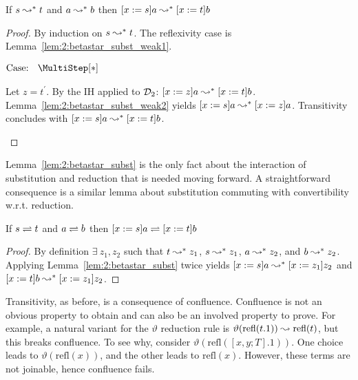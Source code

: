 \begin{lemma}
    If $s \leadsto^* t$ and $a \leadsto^* b$ then $[x := s]a \leadsto^* [x := t]b$
    \label{lem:2:betastar_subst}
\end{lemma}
\begin{proof}
    By induction on $s \leadsto^* t$.
    The reflexivity case is Lemma~\ref{lem:2:betastar_subst_weak1}.

    $\text{Case: }\begin{array}{c} \MultiStep[*] \end{array}$
    \begin{proofcase}
        Let $z = t^\prime$.
        By the IH applied to $\mathcal{D}_{2}$: $[x := z]a \leadsto^* [x := t]b$.
        Lemma~\ref{lem:2:betastar_subst_weak2} yields $[x := s]a \leadsto^* [x := z]a$.
        Transitivity concludes with $[x := s]a \leadsto^* [x := t]b$.
    \end{proofcase}
\end{proof}

Lemma~\ref{lem:2:betastar_subst} is the only fact about the interaction of substitution and reduction that is needed moving forward.
A straightforward consequence is a similar lemma about substitution commuting with convertibility w.r.t. reduction.

\begin{lemma}
    If $s \rightleftharpoons t$ and $a \rightleftharpoons b$ then $[x := s]a \rightleftharpoons [x := t]b$
    \label{lem:2:betaconv_subst}
\end{lemma}
\begin{proof}
    By definition $\exists\ z_1, z_2$ such that $t \leadsto^* z_1$, $s \leadsto^* z_1$, $a \leadsto^* z_2$, and $b \leadsto^* z_2$.
    Applying Lemma~\ref{lem:2:betastar_subst} twice yields $[x := s]a \leadsto^* [x := z_1]z_2$ and $[x := t]b \leadsto^* [x := z_1]z_2$.
\end{proof}

Transitivity, as before, is a consequence of confluence.
Confluence is not an obvious property to obtain and can also be an involved property to prove.
For example, a natural variant for the $\vartheta$ reduction rule is $\vartheta(\text{refl}(t.1)) \leadsto \text{refl}(t)$, but this breaks confluence.
To see why, consider $\vartheta(\text{refl}([x, y; T].1))$.
One choice leads to $\vartheta(\text{refl}(x))$, and the other leads to $\text{refl}(x)$.
However, these terms are not joinable, hence confluence fails.
